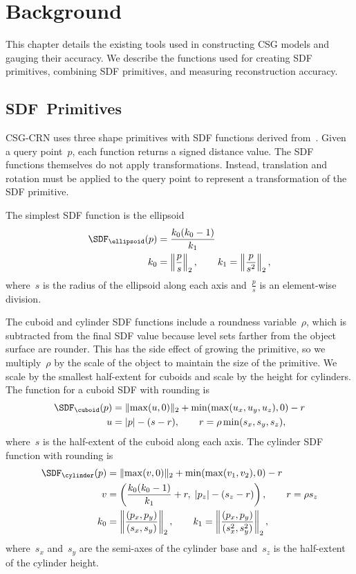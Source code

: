 
\chapter{Background}
\label{chap:background}

This chapter details the existing tools used in constructing CSG models and gauging their accuracy. We describe the functions used for creating SDF primitives, combining SDF primitives, and measuring reconstruction accuracy.

\section{SDF~Primitives}
\label{subsec:sdf_primitives}

CSG-CRN uses three shape primitives with SDF functions derived from~\cite{Quilez2011}. Given a query point~$p$, each function returns a signed distance value. The SDF functions themselves do not apply transformations. Instead, translation and rotation must be applied to the query point to represent a transformation of the SDF primitive.

The simplest SDF function is the ellipsoid
\begin{align*}
	\SDF_{\ellipsoid}(p) &= \frac{k_0 (k_0 - 1)}{k_1} \\
	k_0 &= \left\lVert \frac{p}{s} \right\rVert_2, \qquad
	k_1 = \left\lVert \frac{p}{s^2} \right\rVert_2,
\end{align*}
where~$s$ is the radius of the ellipsoid along each axis and~$\frac{p}{s}$ is an element-wise division.

The cuboid and cylinder SDF functions include a roundness variable~$\rho$, which is subtracted from the final SDF value because level sets farther from the object surface are rounder. This has the side effect of growing the primitive, so we multiply~$\rho$ by the scale of the object to maintain the size of the primitive. We scale by the smallest half-extent for cuboids and scale by the height for cylinders. The function for a cuboid SDF with rounding is
\begin{align*}
	\SDF_{\cuboid}(p) &= \lVert \max(u, 0) \rVert_2 + \min(\max(u_x, u_y, u_z), 0) - r \\
	u &= |p| - (s - r), \qquad r = \rho \min(s_x, s_y, s_z),
\end{align*}
where~$s$ is the half-extent of the cuboid along each axis. The cylinder SDF function with rounding is
\begin{align*}
	\SDF_{\cylinder}(p) &= \lVert \max(v, 0) \rVert_2 + \min(\max(v_1, v_2), 0) - r \\
	v &= \left( \frac{k_0 (k_0 - 1)}{k_1} + r, \; |p_z| - (s_z - r) \right), \qquad r = \rho s_z \\
	k_0 &= \left\lVert \frac{(p_x, p_y)}{(s_x, s_y)} \right\rVert_2, \qquad
	k_1 = \left\lVert \frac{(p_x, p_y)}{(s_x^2, s_y^2)} \right\rVert_2,
\end{align*}
where~$s_x$ and~$s_y$ are the semi-axes of the cylinder base and~$s_z$ is the half-extent of the cylinder height.

